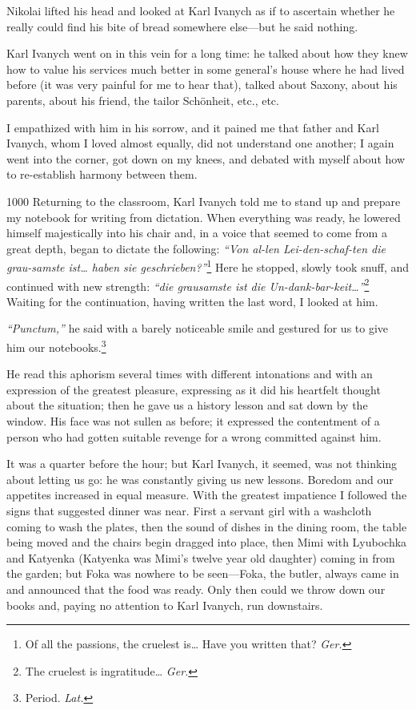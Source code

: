 Nikolai lifted his head and looked at Karl Ivanych as if to ascertain whether he really could find his bite of bread somewhere else---but he said nothing.

Karl Ivanych went on in this vein for a long time: he talked about how they knew how to value his services much better in some general's house where he had lived before (it was very painful for me to hear that), talked about Saxony, about his parents, about his friend, the tailor Sch\"onheit, etc., etc.

I empathized with him in his sorrow, and it pained me that father and Karl Ivanych, whom I loved almost equally, did not understand one another; I again went into the corner, got down on my knees, and debated with myself about how to re-establish harmony between them.

\begin{tolerant}{1000}
Returning to the classroom, Karl Ivanych told me to stand up and prepare my notebook for writing from dictation. When everything was ready, he lowered himself majestically into his chair and, in a voice that seemed to come from a great depth, began to dictate the following: \textit{``Von al-len Lei-den-schaf-ten die grau-samste ist\ldots{} haben sie geschrieben?''}\footnote{Of all the passions, the cruelest is\ldots{} Have you written that? \textit{Ger.}} Here he stopped, slowly took snuff, and continued with new strength: \textit{``die grausamste ist die Un-dank-bar-keit\ldots{}''}\footnote{The cruelest is ingratitude\ldots{} \textit{Ger.}} Waiting for the continuation, having written the last word, I looked at him. %
\end{tolerant}

\textit{``Punctum,''} he said with a barely noticeable smile and gestured for us to give him our notebooks.\footnote{Period. \textit{Lat.}} %

He read this aphorism several times with different intonations and with an expression of the greatest pleasure, expressing as it did his heartfelt thought about the situation; then he gave us a history lesson and sat down by the window. His face was not sullen as before; it expressed the contentment of a person who had gotten suitable revenge for a wrong committed against him.

It was a quarter before the hour; but Karl Ivanych, it seemed, was not thinking about letting us go: he was constantly giving us new lessons. Boredom and our appetites increased in equal measure. With the greatest impatience I followed the signs that suggested dinner was near. First a servant girl with a washcloth coming to wash the plates, then the sound of dishes in the dining room, the table being moved and the chairs begin dragged into place, then Mimi with Lyubochka and Katyenka (Katyenka was Mimi's twelve year old daughter) coming in from the garden; but Foka was nowhere to be seen---Foka, the butler, always came in and announced that the food was ready. Only then could we throw down our books and, paying no attention to Karl Ivanych, run downstairs.

